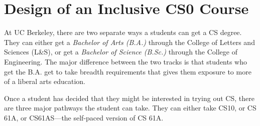 \documentclass[twoside,openright,titlepage,numbers=noenddot,headinclude,%
               footinclude=true,cleardoublepage=empty,abstractoff,BCOR=5mm,%
               paper=a4,fontsize=11pt,ngerman,american]{scrreprt}
\numberwithin{theorem}{chapter}
\numberwithin{definition}{chapter}
\numberwithin{algorithm}{chapter}
\numberwithin{figure}{chapter}
\numberwithin{table}{chapter}
\numberwithin{equation}{chapter}
\begin{document}
\section *{Design of an Inclusive CS0 Course}
At UC Berkeley, there are two separate ways a students can get a CS degree. They can either get a \emph{Bachelor of Arts (B.A.)} through the College of Letters and Sciences (L\&S), or get a \emph{Bachelor of Science (B.Sc.)} through the College of Engineering. The major difference between the two tracks is that students who get the B.A. get to take breadth requirements that gives them exposure to more of a liberal arts education. 

Once a student has decided that they might be interested in trying out CS, there are three major pathways the student can take. They can either take CS10, or CS 61A, or CS61AS---the self-paced version of CS 61A.
\end{document}
